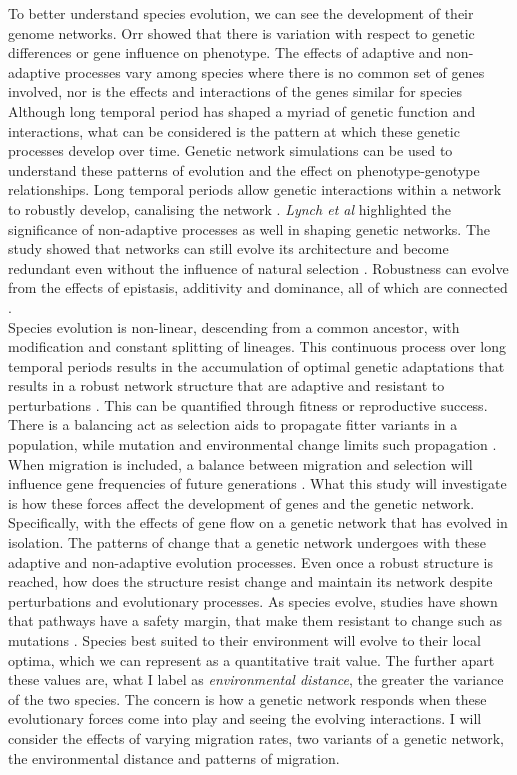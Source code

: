 To better understand species evolution, we can see the development of their genome networks. Orr showed that there is variation with respect to genetic differences or gene influence on phenotype. The effects of adaptive and non-adaptive processes vary among species where there is no common set of genes involved, nor is the effects and interactions of the genes similar for species \cite{orr1998population} Although long temporal period has shaped a myriad of genetic function and interactions, what can be considered is the pattern at which these genetic processes develop over time. Genetic network simulations can be used to understand these patterns of evolution and the effect on phenotype-genotype relationships. Long temporal periods allow genetic interactions within a network to robustly develop, canalising the network \cite{orr1998population,lynch2007evolution}. \textit{Lynch et al} highlighted the significance of non-adaptive processes as well in shaping genetic networks. The study showed that networks can still evolve its architecture and become redundant even without the influence of natural selection \cite{lynch2007evolution}. Robustness can evolve from the effects of epistasis, additivity and dominance, all of which are connected \cite{omholt2000gene}.\\
Species evolution is non-linear, descending from a common ancestor, with modification and constant splitting of lineages. This continuous process over long temporal periods results in the accumulation of optimal genetic adaptations that results in a robust network structure that are adaptive and resistant to perturbations \cite{hinman2009evolution}. This can be quantified through fitness or reproductive success. There is a balancing act as selection aids to propagate fitter variants in a population, while mutation and environmental change limits such propagation \cite{burt1995evolution}. When migration is included, a balance between migration and selection will influence gene frequencies of future generations \cite{brown1992evolution}. What this study will investigate is how these forces affect the development of genes and the genetic network. Specifically, with the effects of gene flow on a genetic network that has evolved in isolation. The patterns of change that a genetic network undergoes with these adaptive and non-adaptive evolution processes. Even once a robust structure is reached, how does the structure resist change and maintain its network despite perturbations and evolutionary processes. As species evolve, studies have shown that pathways have a safety margin, that make them resistant to change such as mutations \cite{bourguet1999evolution}. Species best suited to their environment will evolve to their local optima, which we can represent as a quantitative trait value. The further apart these values are, what I label as \textit{environmental distance}, the greater the variance of the two species. The concern is how a genetic network responds when these evolutionary forces come into play and seeing the evolving interactions. I will consider the effects of varying migration rates, two variants of a genetic network, the environmental distance and patterns of migration.
